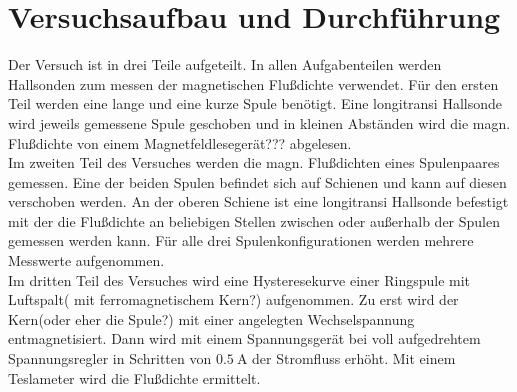 \section{Versuchsaufbau und Durchführung}
\label{sec:Durchführung}

Der Versuch ist in drei Teile aufgeteilt. In allen Aufgabenteilen werden Hallsonden zum messen der magnetischen Flußdichte verwendet.
Für den ersten Teil werden eine lange und eine kurze Spule benötigt. Eine longitransi Hallsonde wird jeweils gemessene Spule geschoben 
und in kleinen Abständen wird die magn. Flußdichte von einem Magnetfeldlesegerät??? abgelesen.\\
Im zweiten Teil des Versuches werden die magn. Flußdichten eines Spulenpaares gemessen. Eine der beiden Spulen befindet sich auf Schienen 
und kann auf diesen verschoben werden. An der oberen Schiene ist eine longitransi Hallsonde befestigt mit der die Flußdichte an beliebigen 
Stellen zwischen oder außerhalb der Spulen gemessen werden kann. Für alle drei Spulenkonfigurationen werden mehrere Messwerte aufgenommen.\\
Im dritten Teil des Versuches wird eine Hysteresekurve einer Ringspule mit Luftspalt( mit ferromagnetischem Kern?) aufgenommen. Zu erst wird der Kern(oder eher die Spule?) 
mit einer angelegten Wechselspannung entmagnetisiert. Dann wird mit einem Spannungsgerät bei voll aufgedrehtem Spannungsregler in Schritten von 
$\SI{0.5}{\ampere}$ der Stromfluss erhöht. Mit einem Teslameter wird die Flußdichte ermittelt.